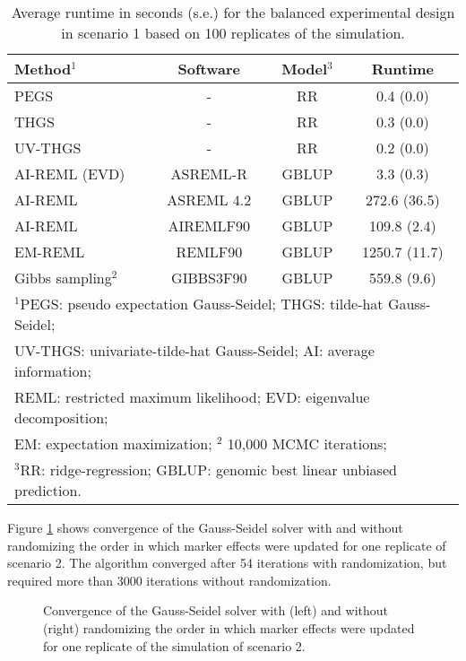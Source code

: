 \documentclass{bmcart}
\def\texttt{[image: ]}
\begin{document}
\begin{table}[ht]
\centering
\renewcommand*{\arraystretch}{1.2}
\caption{Average runtime in seconds (s.e.) for the balanced experimental design in scenario 1 based on 100 replicates of the simulation.}\smallskip
\begin{tabular}{l c c c}
\hline
Method$^1$ & Software & Model$^3$ & Runtime \\
\hline
PEGS & - & RR & 0.4 (0.0) \\
THGS & - & RR & 0.3 (0.0) \\
UV-THGS & - & RR & 0.2 (0.0) \\
AI-REML (EVD) & ASREML-R & GBLUP & 3.3 (0.3) \\
AI-REML & ASREML 4.2 & GBLUP & 272.6 (36.5) \\
AI-REML & AIREMLF90 & GBLUP & 109.8 (2.4) \\
EM-REML & REMLF90 & GBLUP & 1250.7 (11.7) \\
Gibbs sampling$^2$ & GIBBS3F90 & GBLUP & 559.8 (9.6) \\
\hline
\multicolumn{4}{l}{\small $^1$PEGS: pseudo expectation Gauss-Seidel; THGS: tilde-hat Gauss-Seidel;}\\
\multicolumn{4}{l}{\small UV-THGS: univariate-tilde-hat Gauss-Seidel; AI: average information;}\\
\multicolumn{4}{l}{\small REML: restricted maximum likelihood; EVD: eigenvalue decomposition; }\\
\multicolumn{4}{l}{\small{EM: expectation maximization; $^2$ 10,000 MCMC iterations;}}\\
\multicolumn{4}{l}{\small{ $^3$RR: ridge-regression; GBLUP: genomic best linear unbiased prediction.}}
\end{tabular}
\label{RUNTIME1}
\end{table}

Figure \ref{convergence} shows convergence of the Gauss-Seidel solver with and without  randomizing the order in which marker effects were updated for one replicate of scenario 2. The algorithm converged after 54 iterations with randomization, but required more than 3000 iterations without randomization.

\begin{figure}[ht]
  \caption{\small{Convergence of the Gauss-Seidel solver with (left) and without (right) randomizing the order in which marker effects were updated for one replicate of the simulation of scenario 2.}}
  \label{convergence}
\end{figure}
\end{document}
